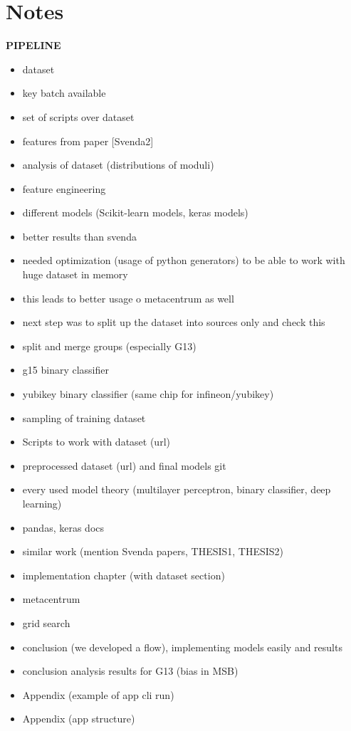\chapter{Notes}

\textbf{PIPELINE}
\begin{itemize}

\item dataset
\item key batch available
\item set of scripts over dataset
\item features from paper [Svenda2]
\item analysis of dataset (distributions of moduli)
\item feature engineering
\item different models (Scikit-learn models, keras models)
\item better results than svenda
\item needed optimization (usage of python generators) to be able to work with huge dataset in memory
\item this leads to better usage o metacentrum as well
\item next step was to split up the dataset into sources only and check this
\item split and merge groups (especially G13)
\item g15 binary classifier
\item yubikey binary classifier (same chip for infineon/yubikey)
\item sampling of training dataset 
\item Scripts to work with dataset (url)
\item preprocessed dataset (url) and final models git
\item every used model theory (multilayer perceptron, binary classifier, deep learning)
\item pandas, keras docs
\item similar work (mention Svenda papers, THESIS1, THESIS2)

\item implementation chapter (with dataset section)
\item metacentrum
\item grid search
\item conclusion (we developed a flow), implementing models easily and results
\item conclusion analysis results for G13 (bias in MSB)

\item Appendix (example of app cli run)
\item Appendix (app structure)

\end{itemize}